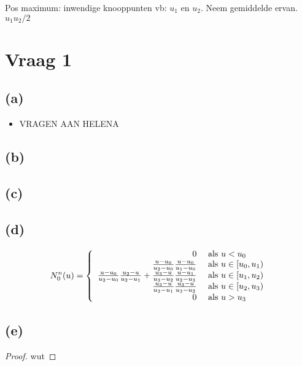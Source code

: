 \documentclass[10pt,a4paper]{article}
\begin{document}
Pos maximum: inwendige knooppunten vb: $u_1$ en $u_2$. Neem gemiddelde ervan. $u_1u_2/2$
\section{Vraag 1}
\subsection*{(a)}
\begin{itemize}
\item
VRAGEN AAN HELENA

\end{itemize}
\subsection*{(b)}
\subsection*{(c)}
\subsection*{(d)}
\[
N_{0}^{n}(u) =
\left\{
\begin{array}{r l}
0 &\text{ als } u < u_0\\
  \frac{u-u_0}{u_2-u_0}\frac{u-u_0}{u_1-u_0} &\text{ als } u \in [u_0,u_1)\\
  \frac{u-u_0}{u_2-u_0}\frac{u_2-u}{u_2-u_1} + \frac{u_3-u}{u_3-u_2}\frac{u-u_1}{u_2-u_3} &\text{ als } u \in [u_1,u_2)\\
  \frac{u_3-u}{u_3-u_1}\frac{u_3-u}{u_3-u_2} &\text{ als } u \in [u_2,u_3)\\
0 &\text{ als } u > u_3\\
\end{array}
\right.
\]
\subsection*{(e)}
\begin{proof}
wut
\end{proof}




\end{document}
